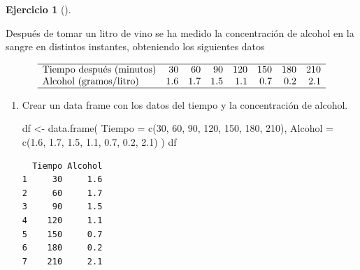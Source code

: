 \documentclass[
  spanish,
  a4paper,
]{scrreport}
\newenvironment{Shaded}{\begin{snugshade}}{\end{snugshade}}
\newcommand{\AttributeTok}[1]{\textcolor[rgb]{0.40,0.45,0.13}{#1}}
\newcommand{\DecValTok}[1]{\textcolor[rgb]{0.68,0.00,0.00}{#1}}
\newcommand{\FloatTok}[1]{\textcolor[rgb]{0.68,0.00,0.00}{#1}}
\newcommand{\FunctionTok}[1]{\textcolor[rgb]{0.28,0.35,0.67}{#1}}
\newcommand{\NormalTok}[1]{\textcolor[rgb]{0.00,0.23,0.31}{#1}}
\newcommand{\OtherTok}[1]{\textcolor[rgb]{0.00,0.23,0.31}{#1}}
\theoremstyle{definition}
\newtheorem{exercise}{Ejercicio}[chapter]
\theoremstyle{remark}
\begin{document}
\begin{exercise}[]\protect\hypertarget{exr-regresion-metabolismo-alcohol}{}\label{exr-regresion-metabolismo-alcohol}

Después de tomar un litro de vino se ha medido la concentración de
alcohol en la sangre en distintos instantes, obteniendo los siguientes
datos

\[
\begin{array}{lrrrrrrr}
\hline 
\mbox{Tiempo después (minutos)} & 30 & 60 & 90 & 120 & 150 & 180 & 210\\ 
\mbox{Alcohol (gramos/litro)} & 1.6 & 1.7 & 1.5 & 1.1 & 0.7 & 0.2 & 2.1\\
\hline
\end{array}
\]

\begin{enumerate}
\def\labelenumi{\alph{enumi}.}
\item
  Crear un data frame con los datos del tiempo y la concentración de
  alcohol.

  \begin{tcolorbox}[enhanced jigsaw, arc=.35mm, bottomrule=.15mm, bottomtitle=1mm, breakable, colback=white, colbacktitle=quarto-callout-tip-color!10!white, colframe=quarto-callout-tip-color-frame, coltitle=black, left=2mm, leftrule=.75mm, opacityback=0, opacitybacktitle=0.6, rightrule=.15mm, title=\textcolor{quarto-callout-tip-color}{\faLightbulb}\hspace{0.5em}{Solución}, titlerule=0mm, toprule=.15mm, toptitle=1mm]

\begin{Shaded}
\begin{Highlighting}[]
\NormalTok{df }\OtherTok{\textless{}{-}} \FunctionTok{data.frame}\NormalTok{(}
    \AttributeTok{Tiempo =} \FunctionTok{c}\NormalTok{(}\DecValTok{30}\NormalTok{, }\DecValTok{60}\NormalTok{, }\DecValTok{90}\NormalTok{, }\DecValTok{120}\NormalTok{, }\DecValTok{150}\NormalTok{, }\DecValTok{180}\NormalTok{, }\DecValTok{210}\NormalTok{),}
    \AttributeTok{Alcohol =} \FunctionTok{c}\NormalTok{(}\FloatTok{1.6}\NormalTok{, }\FloatTok{1.7}\NormalTok{, }\FloatTok{1.5}\NormalTok{, }\FloatTok{1.1}\NormalTok{, }\FloatTok{0.7}\NormalTok{, }\FloatTok{0.2}\NormalTok{, }\FloatTok{2.1}\NormalTok{)}
\NormalTok{)}
\NormalTok{df}
\end{Highlighting}
\end{Shaded}

\begin{verbatim}
  Tiempo Alcohol
1     30     1.6
2     60     1.7
3     90     1.5
4    120     1.1
5    150     0.7
6    180     0.2
7    210     2.1
\end{verbatim}


\end{tcolorbox}
\end{enumerate}
\end{exercise}
\end{document}
